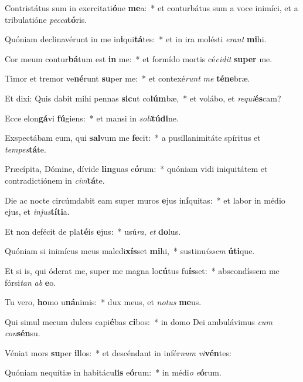 \item Contristátus sum in exercitati\textbf{ó}ne \textbf{me}a:~* et conturbátus sum a voce inimíci, et a tribulatióne \textit{pec}\textit{ca}\textbf{tó}ris.
\item Quóniam declinavérunt in me in\textbf{i}qui\textbf{tá}tes:~* et in ira molésti \textit{e}\textit{rant} \textbf{mi}hi.
\item Cor meum contur\textbf{bá}tum est \textbf{in} me:~* et formído mortis cé\textit{ci}\textit{dit} \textbf{su}\textbf{per} me.
\item Timor et tremor ve\textbf{né}runt \textbf{su}per me:~* et contexé\textit{runt} \textit{me} \textbf{té}\textbf{ne}bræ.
\item Et dixi: Quis dabit mihi pennas \textbf{sic}ut co\textbf{lúm}bæ,~* et volábo, et \textit{re}\textit{qui}\textbf{és}cam?
\item Ecce elon\textbf{gá}vi \textbf{fú}giens:~* et mansi in \textit{so}\textit{li}\textbf{tú}\textbf{di}ne.
\item Exspectábam eum, qui \textbf{sal}vum me \textbf{fe}cit:~* a pusillanimitáte spíritus et \textit{tem}\textit{pes}\textbf{tá}te.
\item Præcípita, Dómine, dívide \textbf{lin}guas e\textbf{ó}rum:~* quóniam vidi iniquitátem et contradictiónem in \textit{ci}\textit{vi}\textbf{tá}te.
\item Die ac nocte circúmdabit eam super muros \textbf{e}jus in\textbf{í}quitas:~* et labor in médio ejus, et \textit{in}\textit{jus}\textbf{tí}\textbf{ti}a.
\item Et non defécit de pla\textbf{té}is \textbf{e}jus:~* usú\textit{ra}, \textit{et} \textbf{do}lus.
\item Quóniam si inimícus meus maledi\textbf{xís}set \textbf{mi}hi,~* sustinu\textit{ís}\textit{sem} \textbf{ú}\textbf{ti}que.
\item Et si is, qui óderat me, super me magna lo\textbf{cú}tus fu\textbf{ís}set:~* abscondíssem me fórsi\textit{tan} \textit{ab} \textbf{e}o.
\item Tu vero, \textbf{ho}mo u\textbf{ná}nimis:~* dux meus, et \textit{no}\textit{tus} \textbf{me}us.
\item Qui simul mecum dulces capi\textbf{é}bas \textbf{ci}bos:~* in domo Dei ambulávimus \textit{cum} \textit{con}\textbf{sén}su.
\item Véniat mors \textbf{su}per \textbf{il}los:~* et descéndant in infér\textit{num} \textit{vi}\textbf{vén}tes:
\item Quóniam nequítiæ in habitácu\textbf{lis} e\textbf{ó}rum:~* in médi\textit{o} \textit{e}\textbf{ó}rum.
